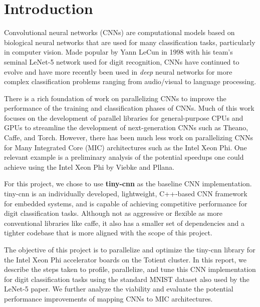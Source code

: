 
\section{Introduction}
\label{sec-intro}

Convolutional neural networks (CNNs) are computational models based on
biological neural networks that are used for many classification tasks,
particularly in computer vision. Made popular by Yann LeCun in 1998 with
his team's seminal LeNet-5 network used for digit recognition, CNNs have
continued to evolve and have more recently been used in \emph{deep}
neural networks for more complex classification problems ranging from
audio/visual to language processing.

There is a rich foundation of work on parallelizing CNNs to improve the
performance of the training and classification phases of CNNs. Much of
this work focuses on the development of parallel libraries for
general-purpose CPUs and GPUs to streamline the development of
next-generation CNNs such as Theano, Caffe, and Torch. However, there has
been much less work on parallelizing CNNs for Many Integrated Core (MIC)
architectures such as the Intel Xeon Phi. One relevant example is a
preliminary analysis of the potential speedups one could achieve using
the Intel Xeon Phi by Viebke and Pllana.

For this project, we chose to use \textbf{tiny-cnn} as the baseline CNN
implementation. tiny-cnn is an individually developed, lightweight,
C++-based CNN framework for embedded systems, and is capable of achieving
competitive performance for digit classification tasks. Although not as
aggressive or flexible as more conventional libraries like caffe, it also
has a smaller set of dependencies and a tighter codebase that is more
aligned with the scope of this project.

The objective of this project is to parallelize and optimize the tiny-cnn
library for the Intel Xeon Phi accelerator boards on the Totient
cluster. In this report, we describe the steps taken to profile,
parallelize, and tune this CNN implementation for digit classification
tasks using the standard MNIST dataset also used by the LeNet-5 paper. We
further analyze the viability and evaluate the potential performance
improvements of mapping CNNs to MIC architectures.
